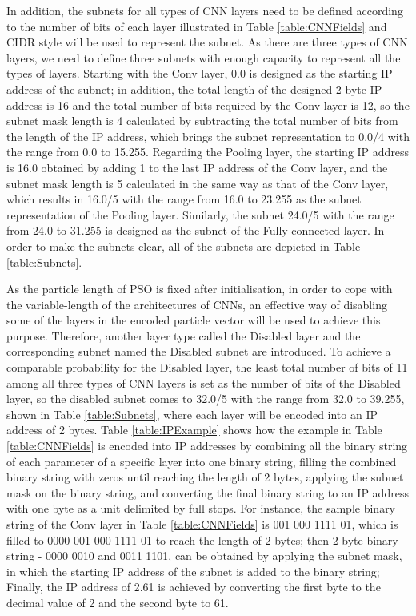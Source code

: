 \documentclass[conference]{IEEEtran}
\begin{document}
In addition, the subnets for all types of CNN layers need to be defined according to the number of bits of each layer illustrated in Table \ref{table:CNNFields} and CIDR style will be used to represent the subnet. As there are three types of CNN layers, we need to define three subnets with enough capacity to represent all the types of layers. Starting with the Conv layer, 0.0 is designed as the starting IP address of the subnet; in addition, the total length of the designed 2-byte IP address is 16 and the total number of bits required by the Conv layer is 12, so the subnet mask length is 4 calculated by subtracting the total number of bits from the length of the IP address, which brings the subnet representation to 0.0/4 with the range from 0.0 to 15.255. Regarding the Pooling layer, the starting IP address is 16.0 obtained by adding 1 to the last IP address of the Conv layer, and the subnet mask length is 5 calculated in the same way as that of the Conv layer, which results in 16.0/5 with the range from 16.0 to 23.255 as the subnet representation of the Pooling layer. Similarly, the subnet 24.0/5 with the range from 24.0 to 31.255 is designed as the subnet of the Fully-connected layer. In order to make the subnets clear, all of the subnets are depicted in Table \ref{table:Subnets}.


As the particle length of PSO is fixed after initialisation, in order to cope with the variable-length of the architectures of CNNs, an effective way of disabling some of the layers in the encoded particle vector will be used to achieve this purpose. Therefore, another layer type called the Disabled layer and the corresponding subnet named the Disabled subnet are introduced. To achieve a comparable probability for the Disabled layer, the least total number of bits of 11 among all three types of CNN layers is set as the number of bits of the Disabled layer, so the disabled subnet comes to 32.0/5 with the range from 32.0 to 39.255, shown in Table \ref{table:Subnets}, where each layer will be encoded into an IP address of 2 bytes. Table \ref{table:IPExample} shows how the example in Table \ref{table:CNNFields} is encoded into IP addresses by combining all the binary string of each parameter of a specific layer into one binary string, filling the combined binary string with zeros until reaching the length of 2 bytes, applying the subnet mask on the binary string, and converting the final binary string to an IP address with one byte as a unit delimited by full stops. For instance, the sample binary string of the Conv layer in Table \ref{table:CNNFields} is 001 000 1111 01, which is filled to 0000 001 000 1111 01 to reach the length of 2 bytes; then 2-byte binary string - 0000 0010 and 0011 1101, can be obtained by applying the subnet mask, in which the starting IP address of the subnet is added to the binary string; Finally, the IP address of 2.61 is achieved by converting the first byte to the decimal value of 2 and the second byte to 61.
\end{document}
